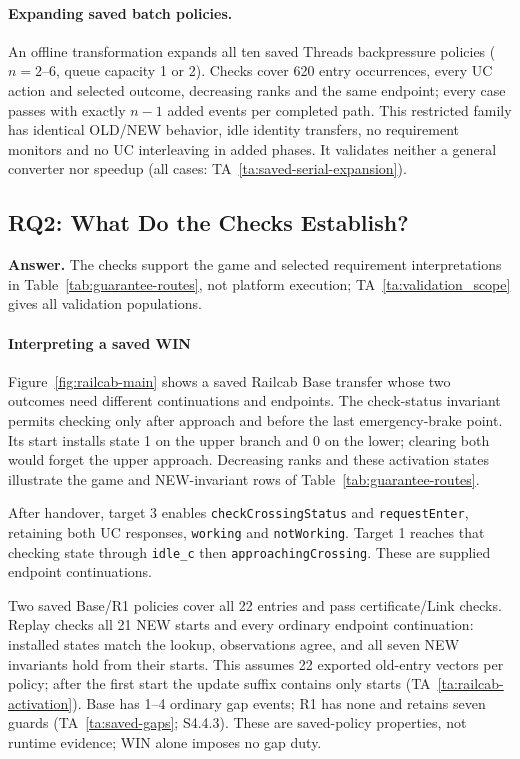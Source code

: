 \documentclass[acmsmall,screen,review,anonymous]{acmart}
\begin{document}
\paragraph{Expanding saved batch policies.}
An offline transformation expands all ten saved Threads backpressure policies ($n=2$--6, queue capacity 1 or 2). Checks cover 620 entry occurrences, every UC action and selected outcome, decreasing ranks and the same endpoint; every case passes with exactly $n-1$ added events per completed path. This restricted family has identical OLD/NEW behavior, idle identity transfers, no requirement monitors and no UC interleaving in added phases. It validates neither a general converter nor speedup (all cases: TA~\ref{ta:saved-serial-expansion}).



\subsection{RQ2: What Do the Checks Establish?}
\label{sec:claim-checks}
\label{sec:rq1}
\textbf{Answer.} The checks support the game and selected requirement interpretations in Table~\ref{tab:guarantee-routes}, not platform execution; TA~\ref{ta:validation_scope} gives all validation populations.

\paragraph{Interpreting a saved WIN}\label{sec:railcab-policy}\label{sec:contract-case}
Figure~\ref{fig:railcab-main} shows a saved Railcab Base transfer whose two outcomes need different continuations and endpoints. The check-status invariant permits checking only after approach and before the last emergency-brake point. Its start installs state 1 on the upper branch and 0 on the lower; clearing both would forget the upper approach. Decreasing ranks and these activation states illustrate the game and NEW-invariant rows of Table~\ref{tab:guarantee-routes}.

After handover, target 3 enables \texttt{checkCrossingStatus} and \texttt{requestEnter}, retaining both UC responses, \texttt{working} and \texttt{notWorking}. Target 1 reaches that checking state through \texttt{idle\_c} then \texttt{approachingCrossing}. These are supplied endpoint continuations.

Two saved Base/R1 policies cover all 22 entries and pass certificate/Link checks. Replay checks all 21 NEW starts and every ordinary endpoint continuation: installed states match the lookup, observations agree, and all seven NEW invariants hold from their starts. This assumes 22 exported old-entry vectors per policy; after the first start the update suffix contains only starts (TA~\ref{ta:railcab-activation}). Base has 1--4 ordinary gap events; R1 has none and retains seven guards (TA~\ref{ta:saved-gaps}; S4.4.3). These are saved-policy properties, not runtime evidence; WIN alone imposes no gap duty.
\end{document}
